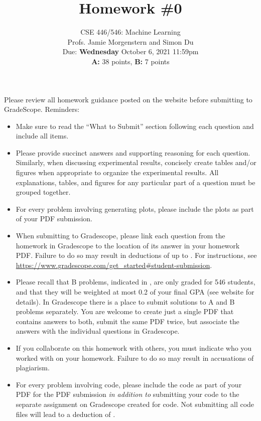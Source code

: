 \documentclass{article}
\begin{document}
\setcounter{aprob}{0}
\setcounter{bprob}{0}
\title{Homework \#0}
\author{
    \normalsize{CSE 446/546: Machine Learning}\\
    \normalsize{Profs. Jamie Morgenstern and Simon Du}\\
    \normalsize{Due: \textbf{Wednesday} October 6, 2021 11:59pm}\\
    \normalsize{\textbf{A:} 38 points, \textbf{B:} 7 points}
}
\date{{}}
\maketitle

\noindent Please review all homework guidance posted on the website before submitting to GradeScope. Reminders:
\begin{itemize}
    \item Make sure to read the ``What to Submit'' section following each question and include all items.
    \item Please provide succinct answers and supporting reasoning for each question. Similarly, when discussing experimental results, concisely create tables and/or figures when appropriate to organize the experimental results. All explanations, tables, and figures for any particular part of a question must be grouped together.
    \item For every problem involving generating plots, please include the plots as part of your PDF submission.
    \item When submitting to Gradescope, please link each question from the homework in Gradescope to the location of its answer in your homework PDF. Failure to do so may result in deductions of up to . For instructions, see \url{https://www.gradescope.com/get_started#student-submission}.
    \item Please recall that B problems, indicated in , are only graded for 546 students, and that they will be weighted at most 0.2 of your final GPA (see website for details). In Gradescope there is a place to submit solutions to A and B problems separately. You are welcome to create just a single PDF that contains answers to both, submit the same PDF twice, but associate the answers with the individual questions in Gradescope. 
    \item If you collaborate on this homework with others, you must indicate who you worked with on your homework. Failure to do so may result in accusations of plagiarism.
    \item For every problem involving code, please include the code as part of your PDF for the PDF submission \emph{in addition to} submitting your code to the separate assignment on Gradescope created for code. Not submitting all code files will lead to a deduction of .  
\end{itemize}
\end{document}
